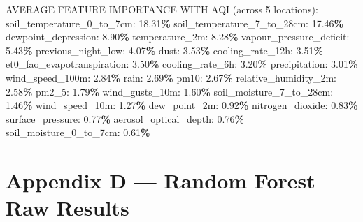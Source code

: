 \documentclass[
  letterpaper,
  DIV=11,
  numbers=noendperiod]{scrartcl}
\newenvironment{Shaded}{\begin{snugshade}}{\end{snugshade}}
\newcommand{\DecValTok}[1]{\textcolor[rgb]{0.00,0.00,0.81}{#1}}
\newcommand{\FloatTok}[1]{\textcolor[rgb]{0.00,0.00,0.81}{#1}}
\newcommand{\NormalTok}[1]{#1}
\newcommand{\OperatorTok}[1]{\textcolor[rgb]{0.81,0.36,0.00}{\textbf{#1}}}
\begin{document}
\begin{Shaded}
\begin{Highlighting}[]
\NormalTok{AVERAGE FEATURE IMPORTANCE WITH AQI (across }\DecValTok{5}\NormalTok{ locations):}
\NormalTok{  soil\_temperature\_0\_to\_7cm: }\FloatTok{18.31}\OperatorTok{\%}
\NormalTok{  soil\_temperature\_7\_to\_28cm: }\FloatTok{17.46}\OperatorTok{\%}
\NormalTok{  dewpoint\_depression: }\FloatTok{8.90}\OperatorTok{\%}
\NormalTok{  temperature\_2m: }\FloatTok{8.28}\OperatorTok{\%}
\NormalTok{  vapour\_pressure\_deficit: }\FloatTok{5.43}\OperatorTok{\%}
\NormalTok{  previous\_night\_low: }\FloatTok{4.07}\OperatorTok{\%}
\NormalTok{  dust: }\FloatTok{3.53}\OperatorTok{\%}
\NormalTok{  cooling\_rate\_12h: }\FloatTok{3.51}\OperatorTok{\%}
\NormalTok{  et0\_fao\_evapotranspiration: }\FloatTok{3.50}\OperatorTok{\%}
\NormalTok{  cooling\_rate\_6h: }\FloatTok{3.20}\OperatorTok{\%}
\NormalTok{  precipitation: }\FloatTok{3.01}\OperatorTok{\%}
\NormalTok{  wind\_speed\_100m: }\FloatTok{2.84}\OperatorTok{\%}
\NormalTok{  rain: }\FloatTok{2.69}\OperatorTok{\%}
\NormalTok{  pm10: }\FloatTok{2.67}\OperatorTok{\%}
\NormalTok{  relative\_humidity\_2m: }\FloatTok{2.58}\OperatorTok{\%}
\NormalTok{  pm2\_5: }\FloatTok{1.79}\OperatorTok{\%}
\NormalTok{  wind\_gusts\_10m: }\FloatTok{1.60}\OperatorTok{\%}
\NormalTok{  soil\_moisture\_7\_to\_28cm: }\FloatTok{1.46}\OperatorTok{\%}
\NormalTok{  wind\_speed\_10m: }\FloatTok{1.27}\OperatorTok{\%}
\NormalTok{  dew\_point\_2m: }\FloatTok{0.92}\OperatorTok{\%}
\NormalTok{  nitrogen\_dioxide: }\FloatTok{0.83}\OperatorTok{\%}
\NormalTok{  surface\_pressure: }\FloatTok{0.77}\OperatorTok{\%}
\NormalTok{  aerosol\_optical\_depth: }\FloatTok{0.76}\OperatorTok{\%}
\NormalTok{  soil\_moisture\_0\_to\_7cm: }\FloatTok{0.61}\OperatorTok{\%}
\end{Highlighting}
\end{Shaded}

\section{Appendix D --- Random Forest Raw
Results}\label{appendix-d-random-forest-raw-results}
\end{document}
